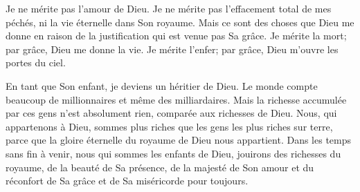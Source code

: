 
Je ne mérite pas l'amour de Dieu. Je ne mérite pas l'effacement total
 de mes péchés, ni la vie éternelle dans Son royaume.
 Mais ce sont des choses que Dieu me donne en raison de la justification
 qui est venue pas Sa grâce. Je mérite la mort; par grâce,
 Dieu me donne la vie. Je mérite l'enfer; par grâce,
 Dieu m'ouvre les portes du ciel. 

En tant que Son enfant, je deviens un héritier de Dieu.
 Le monde compte beaucoup de millionnaires et même des milliardaires.
 Mais la richesse accumulée par ces gens n'est absolument rien,
 comparée aux richesses de Dieu. Nous, qui appartenons à Dieu,
 sommes plus riches que les gens les plus riches sur terre,
 parce que la gloire éternelle du royaume de Dieu nous appartient.
 Dans les temps sans fin à venir, nous qui sommes les enfants de Dieu,
 jouirons des richesses du royaume, de la beauté de Sa présence,
 de la majesté de Son amour et du réconfort de Sa grâce
 et de Sa miséricorde \ocadr pour toujours. 

\dvrule


